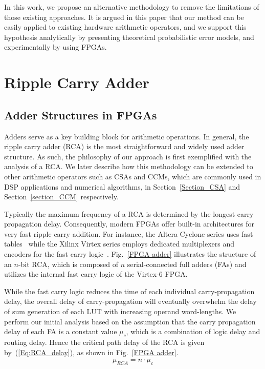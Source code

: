 \documentclass[prodmode,acmtrets]{acmsmall} %
\begin{document}
In this work, we propose an alternative methodology to remove the limitations of those existing approaches. It is argued in this paper that our method can be easily applied to existing hardware arithmetic operators, and we support this hypothesis analytically by presenting theoretical probabilistic error models, and experimentally by using FPGAs.

\section{Ripple Carry Adder}\label{section_RCA}
\subsection{Adder Structures in FPGAs}
Adders serve as a key building block for arithmetic operations. In general, the ripple carry adder (RCA) is the most straightforward and widely used adder structure. As such, the philosophy of our approach is first exemplified with the analysis of a RCA. We later describe how this methodology can be extended to other arithmetic operators such as CSAs and CCMs, which are commonly used in DSP applications and numerical algorithms, in Section~\ref{Section_CSA} and Section~\ref{section_CCM} respectively. 


Typically the maximum frequency of a RCA is determined by the longest carry propagation delay. Consequently, modern FPGAs offer built-in architectures for very fast ripple carry addition. For instance, the Altera Cyclone series uses fast tables~\cite{AlteraCyclone} while the Xilinx Virtex series employs dedicated multiplexers and encoders for the fast carry logic~\cite{Virtex6}. Fig.~\ref{FPGA adder} illustrates the structure of an $n$-bit RCA, which is composed of $n$ serial-connected full adders (FAs) and utilizes the internal fast carry logic of the Virtex-6 FPGA.

While the fast carry logic reduces the time of each individual carry-propagation delay, the overall delay of carry-propagation will eventually overwhelm the delay of sum generation of each LUT with increasing operand word-lengths. We perform our initial analysis based on the assumption that the carry propagation delay of each FA is a constant value $\mu_c$, which is a combination of logic delay and routing delay. Hence the critical path delay of the RCA is given by~(\ref{Eq:RCA_delay}), as shown in Fig.~\ref{FPGA adder}.
%
\begin{eqnarray}\label{Eq:RCA_delay}
	\mu_{RCA}=n\cdot\mu_c
\end{eqnarray}
\end{document}

